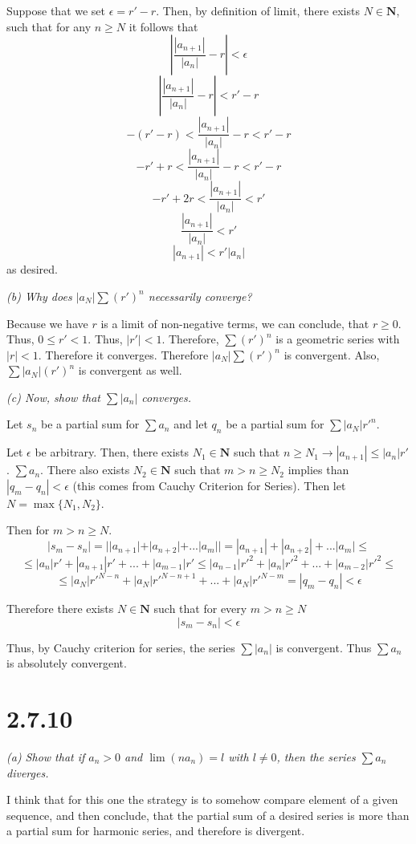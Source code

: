 \documentclass[11pt,oneside,titlepage]{book}
\begin{document}
Suppose that we set $\epsilon = r' - r$. Then, by definition of limit, there
exists $N \in \textbf{N}$, such that for any $n \geq N$ it follows that 
$$|\frac{|a_{n + 1}|}{|a_n|} - r| < \epsilon$$
$$|\frac{|a_{n + 1}|}{|a_n|} - r| < r' - r$$
$$- (r' - r) < \frac{|a_{n + 1}|}{|a_n|} - r < r' - r$$
$$- r' +  r < \frac{|a_{n + 1}|}{|a_n|} - r < r' - r$$
$$- r' + 2r < \frac{|a_{n + 1}|}{|a_n|}  < r'$$
$$\frac{|a_{n + 1}|}{|a_n|}  < r'$$
$$|a_{n + 1}|  < r'|a_n|$$
as desired.

\textit{(b) Why does $|a_N|\sum(r')^n$ necessarily converge? }

Because we have $r$ is a limit of non-negative terms, we can conclude,
that $r \geq 0$. Thus, $0 \leq r'  < 1$. Thus, $|r'| < 1$. Therefore,
$\sum(r')^n$ is a geometric series with $|r| < 1$. Therefore it converges.
Therefore $|a_N| \sum(r')^n$ is convergent. Also, $\sum |a_N| (r')^n$ is
convergent as well.

\textit{(c) Now, show that $\sum |a_n|$ converges.}


Let $s_n$ be a partial sum for $\sum a_n$ and let $q_n$ be a partial sum
for $\sum |a_N| r'^n$.

Let $\epsilon$ be arbitrary. Then, there
exists $N_1 \in \textbf{N}$ such that
$n \geq N_1 \to |a_{n + 1}| \leq |a_n|r'$.
$\sum a_n$. There also exists $N_2 \in \textbf{N}$ such that $m > n \geq N_2$
implies than $|q_m - q_n| < \epsilon$ (this comes from Cauchy Criterion for
Series). Then let  $N = \max\{N_1, N_2\}$.

Then for $m > n \geq N$.
$$|s_m - s_n| = ||a_{n + 1}| + |a_{n + 2}| + ... |a_m|| =
|a_{n + 1}| + |a_{n + 2}| + ... |a_m| \leq$$
$$\leq|a_n|r' + |a_{n + 1}|r' +
... + |a_{m - 1}|r' \leq |a_{n - 1}|r'^2 + |a_{n}|r'^2 + ... +
|a_{m - 2}|r'^2 \leq$$
$$\leq |a_N|r'^{N - n} + |a_N|r'^{N - n + 1} + ... + |a_N|r'^{N - m} =
|q_m - q_n| < \epsilon$$

Therefore there exists $N \in \textbf{N}$ such that for every $m > n \geq N$
$$|s_m - s_n| < \epsilon$$

Thus, by Cauchy criterion for series, the  series $\sum |a_n|$ is convergent.
Thus $\sum a_n$ is absolutely convergent.

\section*{2.7.10}
\textit{(a) Show that if $a_n > 0$ and $\lim(na_n) = l$ with $l \neq 0$,
  then the series $\sum a_n$ diverges. }

I think that for this one the strategy is to somehow compare element
of a given  sequence, and then conclude, that the partial sum of a desired
series is more than a partial sum for harmonic series, and therefore is
divergent.
\end{document}
